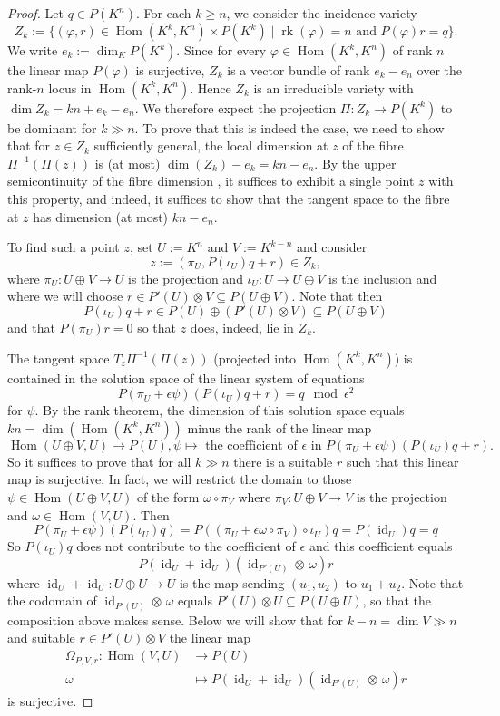 \documentclass{amsart}
\theoremstyle{plain}
\theoremstyle{definition}
\DeclareMathOperator{\id}{id}
\renewcommand{\phi}{\varphi}
\DeclareMathOperator{\rk}{rk}
\DeclareMathOperator{\Hom}{Hom}
\begin{document}
\begin{proof}
Let $q \in P(K^n)$. For each $k \geq n$, we consider the incidence variety
\[
Z_k:=\{(\phi,r) \in \Hom(K^k,K^n) \times P(K^k)
\mid \rk(\phi)=n \text{ and } P(\phi)r=q\}.
\]
We write $e_k:=\dim_K P(K^k)$. Since for every $\phi \in
\Hom(K^k,K^n)$ of rank $n$ the linear map $P(\phi)$ is
surjective, $Z_k$ is a vector
bundle of rank $e_k-e_n$ over the rank-$n$ locus in $\Hom(K^k,K^n)$.
Hence $Z_k$ is an irreducible variety with $\dim Z_k=kn + e_k-e_n$. We
therefore expect the projection $\Pi\colon Z_k \to P(K^k)$ to be dominant for
$k \gg n$. To prove that this is indeed the case, we need to show that for
$z \in Z_k$ sufficiently general, the local dimension at $z$ of the fibre
$\Pi^{-1}(\Pi(z))$ is (at most) $\dim(Z_k)-e_k=kn-e_n$. By the upper semicontinuity
of the fibre dimension \cite[Theorem 11.12]{H:ag}, it suffices to exhibit a single point $z$ with this
property, and indeed, it suffices to show that the tangent space to the
fibre at $z$ has dimension (at most) $kn-e_n$.

To find such a point $z$, set $U:=K^n$ and $V:=K^{k-n}$ and consider
\[
z:=(\pi_U,P(\iota_U)q + r) \in Z_k,
\]
where $\pi_U\colon U \oplus V \to U$ is the projection and $\iota_U\colon U \to
U \oplus V$ is the inclusion and where we will choose $r \in P'(U)
\otimes V \subseteq P(U \oplus V)$. Note that then
\[
P(\iota_U)q + r \in P(U) \oplus (P'(U) \otimes V) \subseteq
P(U \oplus V)
\]
and that $P(\pi_U)r=0$ so that $z$ does, indeed, lie in $Z_k$.

The tangent space $T_z \Pi^{-1}(\Pi(z))$ (projected into $\Hom(K^k,K^n)$)
is contained in the solution space of the linear system of equations
\[
P(\pi_U + \epsilon \psi)(P(\iota_U) q + r) = q \mod \epsilon^2
\]
for $\psi$. By the rank theorem, the dimension of this
solution space equals $kn=\dim(\Hom(K^k,K^n))$ minus the rank of the linear map
\[
\Hom(U \oplus V,U) \to P(U), \psi \mapsto \text{ the
coefficient of $\epsilon$ in }
P(\pi_U + \epsilon \psi)(P(\iota_U) q + r).
\]
So it suffices to prove that for all $k \gg n$ there is a suitable $r$ such that this linear map is surjective. In fact, we will restrict the domain to those $\psi
\in \Hom(U \oplus V,U)$ of the form $\omega\circ \pi_V$ where $\pi_V\colon U \oplus V \to V$ is the projection and $\omega\in\Hom(V,U)$. Then
\[
P(\pi_U + \epsilon \psi)(P(\iota_U) q) =P((\pi_U + \epsilon \omega\circ \pi_V)\circ\iota_U) q=P(\id_U)q=q
\]
So $P(\iota_U)q$ does not contribute to the coefficient of $\epsilon$ and this coefficient equals
\[
P(\id_U + \id_U) (\id_{P'(U)} \otimes \,\omega) r
\]
where $\id_U + \id_U\colon U \oplus U \to U$ is the map sending $(u_1,u_2)$
to $u_1 + u_2$. Note that the codomain of $\id_{P'(U)} \otimes \,\omega$ equals
$P'(U) \otimes U \subseteq P(U \oplus U)$, so that the composition above
makes sense. Below we will show that for $k-n = \dim V \gg n$ and suitable
$r \in P'(U) \otimes V$ the linear map
\begin{align*}
\Omega_{P,V,r}\colon\Hom(V,U) &\to P(U)\\
\omega &\mapsto P(\id_U + \id_U)(\id_{P'(U)} \otimes \,\omega)r
\end{align*}
is surjective.


\end{proof}
\end{document}
